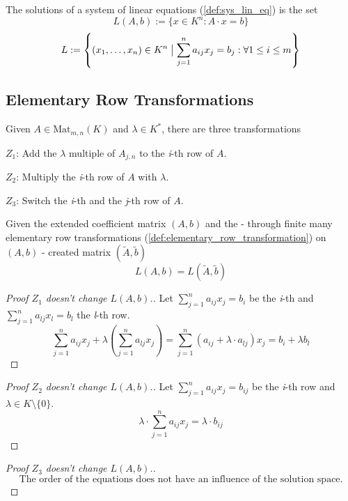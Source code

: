 \begin{definition}
   The solutions of a system of linear equations (\ref{def:sys_lin_eq}) is the set
   \[L(A, b) := \{x \in K^n: A \cdot x = b\}\]
   \[L := \left\{(x_1, \ldots, x_n) \in K^n \bigm| \sum_{j=1}^n a_{ij} x_j = b_{j} : \forall 1 \leq i \leq m \right\}\]
\end{definition}

\subsection{Elementary Row Transformations}
\begin{definition}\label{def:elementary_row_transformation}
   Given \(A \in \text{Mat}_{m, n}(K)\) and \(\lambda \in K^*\), there are three transformations

   \(Z_1\): Add the \(\lambda\) multiple of \(A_{j,n}\) to the \textit{i}-th row of \(A\).

   \(Z_2\): Multiply the \textit{i}-th row of \(A\) with \(\lambda\).

   \(Z_3\): Switch the \textit{i}-th and the \textit{j}-th row of \(A\).
\end{definition}

\begin{theorem}[\(L(A, b) = L(\tilde{A}, \tilde{b})\)]
   Given the extended coefficient matrix \((A, b)\) and the - through finite many elementary row transformations (\ref{def:elementary_row_transformation}) on \((A, b)\) - created matrix \((\tilde{A}, \tilde{b})\)
   \[L(A, b) = L(\tilde{A}, \tilde{b})\]
\end{theorem}

\begin{proof}[Proof \(Z_1\) doesn't change \(L(A, b)\).]
   Let \(\sum_{j=1}^n a_{ij} x_j = b_{i}\) be the \textit{i}-th and \(\sum_{j=1}^n a_{lj} x_l = b_{l}\) the \textit{l}-th row.
   \[\sum_{j=1}^n a_{ij} x_j + \lambda \left(\sum_{j=1}^n a_{lj} x_j\right) = \sum_{j=1}^n (a_{ij} + \lambda \cdot a_{lj}) x_j = b_i + \lambda b_{l}\]
\end{proof}

\begin{proof}[Proof \(Z_2\) doesn't change \(L(A, b)\).]
   Let \(\sum_{j=1}^n a_{ij} x_j = b_{ij}\) be the \textit{i}-th row and \(\lambda \in K \setminus \{0\}\).
   \[\lambda \cdot \sum_{j=1}^n a_{ij} x_j = \lambda \cdot b_{ij}\]
\end{proof}

\begin{proof}[Proof \(Z_3\) doesn't change \(L(A, b)\).]
   \[\text{The order of the equations does not have an influence of the solution space.}\]
\end{proof}

